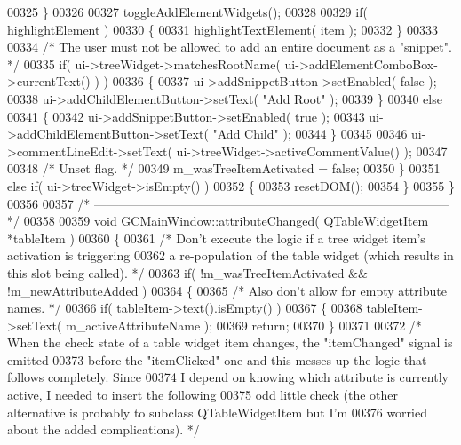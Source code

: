 \begin{DoxyCode}
{00325     \}
00326 
00327     toggleAddElementWidgets();
00328 
00329     \textcolor{keywordflow}{if}( highlightElement )
00330     \{
00331       highlightTextElement( item );
00332     \}
00333 
00334     \textcolor{comment}{/* The user must not be allowed to add an entire document as a "snippet". 
      */}
00335     \textcolor{keywordflow}{if}( ui->treeWidget->matchesRootName( ui->addElementComboBox->currentText() 
      ) )
00336     \{
00337       ui->addSnippetButton->setEnabled( \textcolor{keyword}{false} );
00338       ui->addChildElementButton->setText( \textcolor{stringliteral}{"Add Root"} );
00339     \}
00340     \textcolor{keywordflow}{else}
00341     \{
00342       ui->addSnippetButton->setEnabled( \textcolor{keyword}{true} );
00343       ui->addChildElementButton->setText( \textcolor{stringliteral}{"Add Child"} );
00344     \}
00345 
00346     ui->commentLineEdit->setText( ui->treeWidget->activeCommentValue() );
00347 
00348     \textcolor{comment}{/* Unset flag. */}
00349     m\_wasTreeItemActivated = \textcolor{keyword}{false};
00350   \}
00351   \textcolor{keywordflow}{else} \textcolor{keywordflow}{if}( ui->treeWidget->isEmpty() )
00352   \{
00353     resetDOM();
00354   \}
00355 \}
00356 
00357 \textcolor{comment}{/*
      --------------------------------------------------------------------------------------*/}
00358 
00359 \textcolor{keywordtype}{void} GCMainWindow::attributeChanged( QTableWidgetItem *tableItem )
00360 \{
00361   \textcolor{comment}{/* Don't execute the logic if a tree widget item's activation is triggering}
00362 \textcolor{comment}{    a re-population of the table widget (which results in this slot being
       called). */}
00363   \textcolor{keywordflow}{if}( !m\_wasTreeItemActivated && !m\_newAttributeAdded )
00364   \{
00365     \textcolor{comment}{/* Also don't allow for empty attribute names. */}
00366     \textcolor{keywordflow}{if}( tableItem->text().isEmpty() )
00367     \{
00368       tableItem->setText( m\_activeAttributeName );
00369       \textcolor{keywordflow}{return};
00370     \}
00371 
00372     \textcolor{comment}{/* When the check state of a table widget item changes, the "itemChanged"
       signal is emitted}
00373 \textcolor{comment}{      before the "itemClicked" one and this messes up the logic that follows
       completely.  Since}
00374 \textcolor{comment}{      I depend on knowing which attribute is currently active, I needed to
       insert the following}
00375 \textcolor{comment}{      odd little check (the other alternative is probably to subclass
       QTableWidgetItem but I'm}
00376 \textcolor{comment}{      worried about the added complications). */}
}
\end{DoxyCode}
